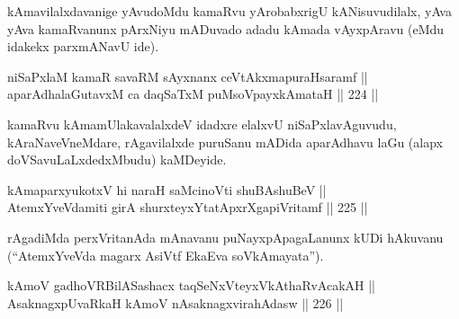 \begin{artha}
kAmavilalxdavanige yAvudoMdu kamaRvu yArobabxrigU kANisuvudilalx, yAva
yAva kamaRvanunx pArxNiyu mADuvado adadu kAmada vAyxpAravu (eMdu
idakekx parxmANavU ide).
\end{artha}

\begin{shl}
niSaPxlaM kamaR savaRM sAyxnanx ceVtAkxmapuraHsaramf || \\
aparAdhalaGutavxM ca daqSaTxM puMsoV\s payxkAmataH \hfill || 224 ||  
\end{shl}

\begin{artha}
kamaRvu kAma\s mUlakavalalxdeV idadxre elalxvU niSaPxlavAguvudu,
kAraNaveVneMdare, rAgavilalxde puruSanu mADida aparAdhavu laGu (alapx
doVSavuLaLxdedxMbudu) kaMDeyide.
\end{artha}

\begin{shl}
kAmaparxyukotxV hi naraH saMcinoVti shuBAshuBeV || \\
AtemxYveVdamiti girA shurxteyxYtatApxrXgapiVritamf \hfill || 225 ||  
\end{shl}

\begin{artha}
rAgadiMda perxVritanAda mAnavanu puNayxpApagaLanunx kUDi hAkuvanu (``AtemxYveVda magarx AsiVtf EkaEva soV\s kAmayata'').
\end{artha}


\begin{shl}
kAmoV gadhoVR\s BilASashacx taqSeNxVteyxVkAthaRvAcakAH || \\
\footnotemark[1]AsaknagxpUvaRkaH kAmoV nA\s \s saknagxvirahAdasw \hfill || 226 ||  
\end{shl}

